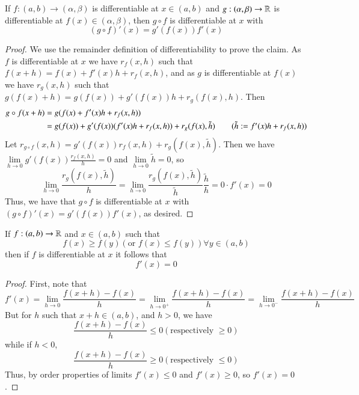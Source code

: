 \begin{proposition}
    If $f:(a,b)\rightarrow (\alpha,\beta)$ is differentiable at $x \in (a,b)$ and $g:(\alpha,\beta)\rightarrow \mathbb R$ is differentiable at $f(x) \in (\alpha,\beta)$, then $g\circ f$ is differentiable at $x$ with \begin{equation*}
        (g\circ f)'(x) = g'(f(x))f'(x)
    \end{equation*}
\end{proposition}
\begin{proof}
    We use the remainder definition of differentiability to prove the claim. As $f$ is differentiable at $x$ we have $r_f(x,h)$ such that $f(x+h) = f(x) + f'(x)h + r_f(x,h)$, and as $g$ is differentiable at $f(x)$ we have $r_g(x,h)$ such that $g(f(x)+h) = g(f(x)) + g'(f(x))h + r_g(f(x),h)$. Then \begin{align*}
        g\circ f(x+h) &= g(f(x)+f'(x)h+r_f(x,h)) \\
        &= g(f(x)) + g'(f(x))(f'(x)h+r_f(x,h)) + r_g(f(x),\tilde{h}) \tag{$\tilde{h}:= f'(x)h+r_f(x,h)$} 
    \end{align*}
    Let $r_{g\circ f}(x,h) = g'(f(x))r_f(x,h) + r_g(f(x),\tilde{h})$. Then we have $\lim\limits_{h\rightarrow 0}g'(f(x))\frac{r_f(x,h)}{h} = 0$ and $\lim\limits_{h\rightarrow 0}\tilde{h} = 0$, so $$\lim\limits_{h\rightarrow 0}\frac{r_g(f(x),\tilde{h})}{h} = \lim\limits_{h\rightarrow 0}\frac{r_g(f(x),\tilde{h})}{\tilde{h}}\frac{\tilde{h}}{h} = 0\cdot f'(x) = 0$$ Thus, we have that $g\circ f$ is differentiable at $x$ with $(g\circ f)'(x) = g'(f(x))f'(x)$, as desired.
\end{proof}

\begin{proposition}\label{prop:4.1.1}
    If $f:(a,b)\rightarrow \mathbb R$ and $x \in (a,b)$ such that \begin{equation*}
        f(x) \geq f(y) (\text{or }f(x) \leq f(y))\forall y \in (a,b)
    \end{equation*}
    then if $f$ is differentiable at $x$ it follows that $$f'(x) = 0$$
\end{proposition}
\begin{proof}
    First, note that $$f'(x) = \lim\limits_{h\rightarrow 0}\frac{f(x+h)-f(x)}{h} = \lim\limits_{h\rightarrow 0^+}\frac{f(x+h) - f(x)}{h} = \lim\limits_{h\rightarrow 0^-}\frac{f(x+h)-f(x)}{h}$$ But for $h$ such that $x+h \in (a,b)$, and $h > 0$, we have $$\frac{f(x+h) - f(x)}{h} \leq 0 (\text{respectively } \geq 0)$$ while if $h < 0$, $$\frac{f(x+h) - f(x)}{h} \geq 0 (\text{respectively }\leq 0)$$ Thus, by order properties of limits $f'(x) \leq 0$ and $f'(x) \geq 0$, so $f'(x) = 0$.
\end{proof}

